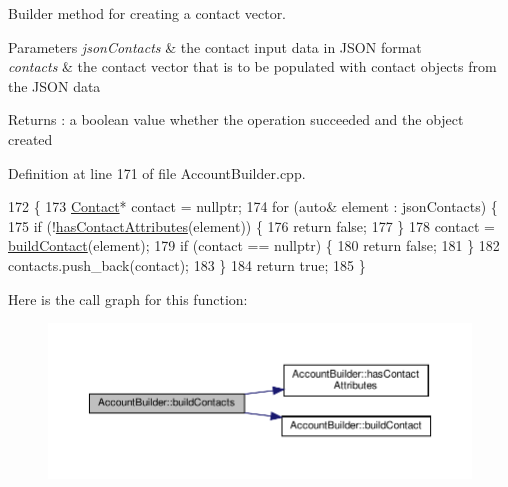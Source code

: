 Builder method for creating a contact vector.


\begin{DoxyParams}{Parameters}
{\em json\+Contacts} & the contact input data in J\+S\+ON format \\
\hline
{\em contacts} & the contact vector that is to be populated with contact objects from the J\+S\+ON data \\
\hline
\end{DoxyParams}
\begin{DoxyReturn}{Returns}
\+: a boolean value whether the operation succeeded and the object created 
\end{DoxyReturn}


Definition at line 171 of file Account\+Builder.\+cpp.


\begin{DoxyCode}
172 \{
173     \hyperlink{class_contact}{Contact}* contact = \textcolor{keyword}{nullptr};
174     \textcolor{keywordflow}{for} (\textcolor{keyword}{auto}& element : jsonContacts) \{
175         \textcolor{keywordflow}{if} (!\hyperlink{class_account_builder_a01b1fa1ec8d5eb397a6e61725d67f5a2}{hasContactAttributes}(element)) \{
176             \textcolor{keywordflow}{return} \textcolor{keyword}{false};
177         \}
178         contact = \hyperlink{class_account_builder_a3a3cc8d8beb8af6c0a9feb79e28adb59}{buildContact}(element);
179         \textcolor{keywordflow}{if} (contact == \textcolor{keyword}{nullptr}) \{
180             \textcolor{keywordflow}{return} \textcolor{keyword}{false};
181         \}
182         contacts.push\_back(contact);
183     \}
184     \textcolor{keywordflow}{return} \textcolor{keyword}{true};
185 \}
\end{DoxyCode}
Here is the call graph for this function\+:\nopagebreak
\begin{figure}[H]
\begin{center}
\leavevmode
\includegraphics[width=350pt]{d9/daa/class_account_builder_aa3af3cf2501508d76ee3f7140deeba80_cgraph}
\end{center}
\end{figure}
